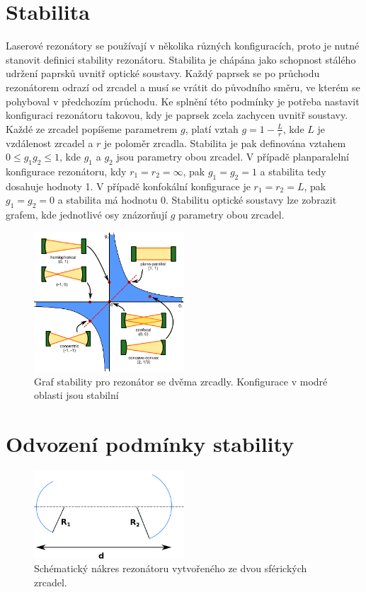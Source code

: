 \documentclass[a4paper,12pt]{article}
\begin{document}
\section{Stabilita}
Laserové rezonátory se používají v několika různých konfiguracích, proto je nutné stanovit definici stability rezonátoru. Stabilita je chápána jako schopnost stálého udržení paprsků uvnitř optické soustavy. Každý paprsek se po průchodu rezonátorem odrazí od zrcadel a musí se vrátit do původního směru, ve kterém se pohyboval v předchozím průchodu. Ke splnění této podmínky je potřeba nastavit konfiguraci rezonátoru takovou, kdy je paprsek zcela zachycen uvnitř soustavy. Každé ze zrcadel popíšeme parametrem $g$, platí vztah $g=1-\frac{L}{r}$, kde $L$ je vzdálenost zrcadel a $r$ je poloměr zrcadla. Stabilita je pak definována vztahem $0 \leq g_1g_2 \leq 1$, kde $g_1$ a $g_2$ jsou parametry obou zrcadel. V případě planparalelní konfigurace rezonátoru, kdy $r_1 = r_2 = \infty$, pak $g_1 = g_2 = 1$ a stabilita tedy dosahuje hodnoty 1.
V případě konfokální konfigurace je $r_1 = r_2 = L$, pak $g_1 = g_2 = 0$ a stabilita má hodnotu 0.
Stabilitu optické soustavy lze zobrazit grafem, kde jednotlivé osy znázorňují $g$ parametry obou zrcadel.



\begin{figure}[h!]
  \centering
    \includegraphics[width=0.5\textwidth]{images/image03.png}
\caption{Graf stability pro rezonátor se dvěma zrcadly. Konfigurace v modré oblasti jsou stabilní \cite{cavity}}
\end{figure}


\section{Odvození podmínky stability}


\begin{figure}[h!]
  \centering
    \includegraphics[width=0.5\textwidth]{images/image04.png}
\caption{Schématický nákres rezonátoru vytvořeného ze dvou sférických zrcadel.}
\end{figure}
\end{document}
